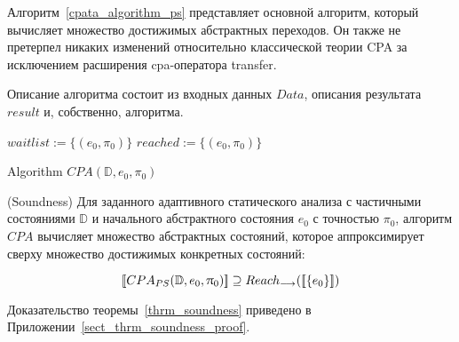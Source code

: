 Алгоритм~\ref{cpata_algorithm_ps} представляет основной алгоритм, который вычисляет множество достижимых абстрактных переходов.
Он также не претерпел никаких изменений относительно классической теории CPA за исключением расширения cpa-оператора transfer.
 
Описание алгоритма состоит из входных данных $Data$, описания результата $result$ и, собственно, алгоритма.

\begin{algorithm}
 $waitlist := \{(e_0, \pi_0)\}$\;
 $reached := \{(e_0, \pi_0)\}$\;


 \caption{Algorithm $CPA(\mathbb{D}, e_0, \pi_0)$}
 \label{cpata_algorithm_ps}
\end{algorithm} 
 
\begin{thrm}
\label{thrm_soundness}
(Soundness) Для заданного адаптивного статического анализа с частичными состояниями $\mathbb{D}$ и начального абстрактного состояния $e_0$ с точностью $\pi_0$, алгоритм $CPA$ вычисляет множество абстрактных состояний, которое аппроксимирует сверху множество достижимых конкретных состояний:

$$[\![ CPA_{PS}(\mathbb{D}, e_0, \uppi_0) ]\!] \supseteq Reach_{\longrightarrow}([\![ \{e_0\} ]\!])$$

\end{thrm}

Доказательство теоремы~\ref{thrm_soundness} приведено в Приложении~\ref{sect_thrm_soundness_proof}.

